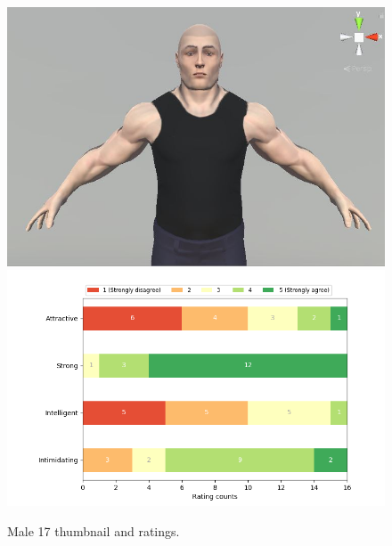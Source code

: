 \begin{figure}[H]
  \includegraphics[width=\linewidth]{Images/Males/17.JPG}
\endminipage\hfill
{}
  \includegraphics[width=\linewidth]{Survey/MRatings/avatar_m17.png}
\endminipage\hfill
\caption{Male 17 thumbnail and ratings.}
\end{figure}


